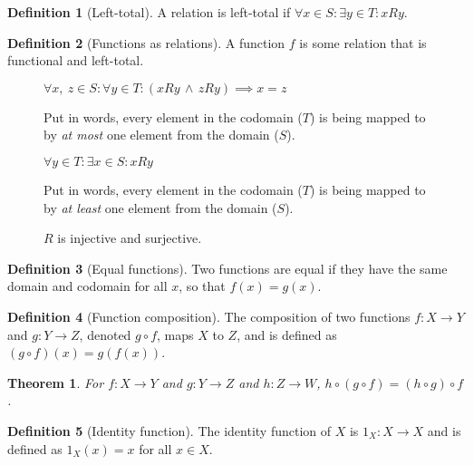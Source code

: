 \documentclass{article}
\theoremstyle{plain}
\newtheorem{theorem}{Theorem}[section]
\numberwithin{theorem}{subsection}
\theoremstyle{definition}
\newtheorem{definition}{Definition}[section]
\numberwithin{definition}{subsection}
\theoremstyle{remark}
\numberwithin{note}{subsection}
\begin{document}
\begin{definition}[Left-total]
    A relation is left-total if
    $\forall x \in S : \exists y \in T : xRy$.
\end{definition}
\begin{definition}[Functions as relations]
    A function $f$ is some relation that is functional and left-total.
\end{definition}
%
\begin{figure}[H]
    \begin{mdframed}[style=exampledefault,frametitle={Function Properties}]
        \begin{description}[style=sameline]
            \item[Injective (one-to-one)]
                $\forall x,\: z \in S : \forall y \in T
                    : (xRy \,\land\, zRy) \implies x = z$

                Put in words, every element in the codomain ($T$)
                is being mapped to by \textit{at most} one element from the domain ($S$).
            \item[Surjective (onto)]
                $\forall y \in T : \exists x \in S : xRy$

                Put in words, every element in the codomain ($T$)
                is being mapped to by \textit{at least} one element from the domain ($S$).
            \item[Bijective]
                $R$ is injective and surjective.
        \end{description}
    \end{mdframed}
\end{figure}
%
\begin{definition}[Equal functions]
    Two functions are equal if they have the same domain and codomain
    for all $x$, so that $f(x) = g(x)$.
\end{definition}
%
\begin{definition}[Function composition]
    The composition of two functions $f:X \to Y$ and $g:Y \to Z$,
    denoted $g \circ f$, maps $X$ to $Z$, and is defined as
    $(g \circ f)(x) = g(f(x))$.
\end{definition}
%
\begin{theorem}
    For $f:X \to Y$ and $g:Y \to Z$ and  $h:Z \to W$,
    $h \circ (g \circ f) = (h \circ g) \circ f$.
\end{theorem}
%
\begin{definition}[Identity function]
    The identity function of $X$ is $1_X:X \to X$ and is defined as
    $1_X (x)=x$ for all $x \in X$.
\end{definition}
\end{document}
